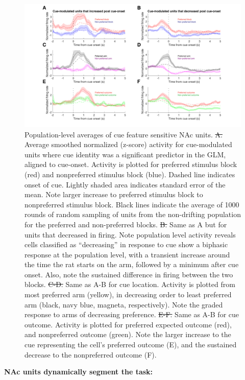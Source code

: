 \documentclass[11pt]{article}
\newcommand{\bsf}[1]{\textbf{#1}}
\providecommand{\DIFadd}[1]{{\protect\color{blue}\uwave{#1}}} %
\providecommand{\DIFdel}[1]{{\protect\color{red}\sout{#1}}}                      %
\providecommand{\DIFaddFL}[1]{\DIFadd{#1}} %
\providecommand{\DIFdelFL}[1]{\DIFdel{#1}} %
\providecommand{\DIFaddbeginFL}{} %
\providecommand{\DIFaddendFL}{} %
\providecommand{\DIFdelbeginFL}{} %
\providecommand{\DIFdelendFL}{} %
\newcommand{\DIFscaledelfig}{0.5}
\newlength{\DIFdelgraphicswidth} %
\newlength{\DIFdelgraphicsheight} %
\newcommand{\DIFaddincludegraphics}[2][]{{\color{blue}\fbox{\DIFOincludegraphics[#1]{#2}}}} %
\newcommand{\DIFdelincludegraphics}[2][]{%
\sbox{\DIFdelgraphicsbox}{\DIFOincludegraphics[#1]{#2}}%
\settoboxwidth{\DIFdelgraphicswidth}{\DIFdelgraphicsbox} %
\settoboxtotalheight{\DIFdelgraphicsheight}{\DIFdelgraphicsbox} %
\scalebox{\DIFscaledelfig}{%
\parbox[b]{\DIFdelgraphicswidth}{\usebox{\DIFdelgraphicsbox}\\[-\baselineskip] \rule{\DIFdelgraphicswidth}{0em}}\llap{\resizebox{\DIFdelgraphicswidth}{\DIFdelgraphicsheight}{%
\setlength{\unitlength}{\DIFdelgraphicswidth}%
\begin{picture}(1,1)%
\thicklines\linethickness{2pt} %
{\color[rgb]{1,0,0}\put(0,0){\framebox(1,1){}}}%
{\color[rgb]{1,0,0}\put(0,0){\line( 1,1){1}}}%
{\color[rgb]{1,0,0}\put(0,1){\line(1,-1){1}}}%
\end{picture}%
}\hspace*{3pt}}} %
} %
\DeclareRobustCommand{\DIFaddbeginFL}{\DIFOaddbeginFL \let\includegraphics\DIFaddincludegraphics} %
\DeclareRobustCommand{\DIFaddendFL}{\DIFOaddendFL \let\includegraphics\DIFOincludegraphics} %
\DeclareRobustCommand{\DIFdelbeginFL}{\DIFOdelbeginFL \let\includegraphics\DIFdelincludegraphics} %
\DeclareRobustCommand{\DIFdelendFL}{\DIFOaddendFL \let\includegraphics\DIFOincludegraphics} %
\begin{document}
{\begin{figure}[h]
\centering
\includegraphics[width=\textwidth]{Fig 7 - Population averages.png}
\caption{Population-level averages of cue feature sensitive NAc units. \DIFdelbeginFL \DIFdelFL{A. }\DIFdelendFL \DIFaddbeginFL \DIFaddFL{\bsf{A}:
  }\DIFaddendFL Average smoothed normalized (z-score) activity for cue-modulated units where
  cue identity was a significant predictor in the GLM, aligned to
  cue-onset. Activity is plotted for preferred stimulus block (red) and
  nonpreferred stimulus block (blue). Dashed line indicates onset of
  cue. Lightly shaded area indicates standard error of the mean. Note larger
  increase to preferred stimulus block to nonpreferred stimulus block. Black
  lines indicate the average of 1000 rounds of random sampling of units from the
  non-drifting population for the preferred and non-preferred blocks. \DIFdelbeginFL \DIFdelFL{B. }\DIFdelendFL \DIFaddbeginFL \DIFaddFL{\bsf{B}:
  }\DIFaddendFL Same as A but for units that decreased in firing. Note population level
  activity reveals cells classified as “decreasing” in response to cue show a
  biphasic response at the population level, with a transient increase around
  the time the rat starts on the arm, followed by a minimum after cue
  onset. Also, note the sustained difference in firing between the two
  blocks. \DIFdelbeginFL \DIFdelFL{C-D. }\DIFdelendFL \DIFaddbeginFL \DIFaddFL{\bsf{C-D}: }\DIFaddendFL Same as A-B for cue location. Activity is plotted from most
  preferred arm (yellow), in decreasing order to least preferred arm (black,
  navy blue, magneta, respectively). Note the graded response to arms of
  decreasing preference. \DIFdelbeginFL \DIFdelFL{E-F. }\DIFdelendFL \DIFaddbeginFL \DIFaddFL{\bsf{E-F}: }\DIFaddendFL Same as A-B for cue outcome. Activity is
  plotted for preferred expected outcome (red), and nonpreferred outcome
  (green). Note the larger increase to the cue representing the cell’s preferred
  outcome (E), and the sustained decrease to the nonpreferred outcome (F).}
\label{fig:pop}
\end{figure}
{\bf NAc units dynamically segment the task:}

}
\end{document}
